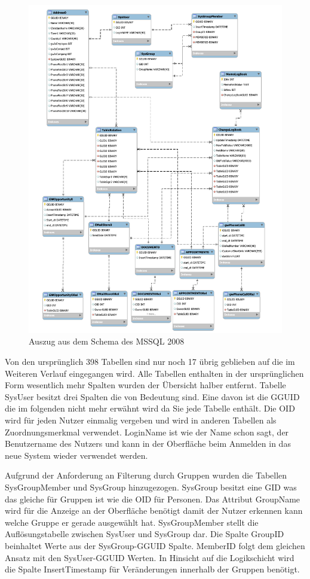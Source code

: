 \begin{figure}[H]
	\centering
  \includegraphics[width=1.0\textwidth]{pics/schema_alt.pdf}
	\caption{Auszug aus dem Schema des MSSQL 2008}
	\label{gw_schema_alt}
\end{figure}

Von den ursprünglich 398 Tabellen sind nur noch 17 übrig geblieben auf die im Weiteren Verlauf eingegangen wird. Alle Tabellen enthalten in der ursprünglichen Form wesentlich mehr Spalten wurden der Übersicht halber entfernt. Tabelle SysUser besitzt drei Spalten die von Bedeutung sind. Eine davon ist die GGUID die im folgenden nicht mehr erwähnt wird da Sie jede Tabelle enthält. Die OID wird für jeden Nutzer einmalig vergeben und wird in anderen Tabellen als Zuordnungsmerkmal verwendet. LoginName ist wie der Name schon sagt, der Benutzername des Nutzers und kann in der Oberfläche beim Anmelden in das neue System wieder verwendet werden. 

Aufgrund der Anforderung an Filterung durch Gruppen wurden die Tabellen SysGroupMember und SysGroup hinzugezogen. SysGroup besitzt eine GID was das gleiche für Gruppen ist wie die OID für Personen. Das Attribut GroupName wird für die Anzeige an der Oberfläche benötigt damit der Nutzer erkennen kann welche Gruppe er gerade ausgewählt hat. SysGroupMember stellt die Auflösungstabelle zwischen SysUser und SysGroup dar. Die Spalte GroupID beinhaltet Werte aus der SysGroup-GGUID Spalte. MemberID folgt dem gleichen Ansatz mit den SysUser-GGUID Werten. In Hinsicht auf die Logikschicht wird die Spalte InsertTimestamp für Veränderungen innerhalb der Gruppen benötigt.

